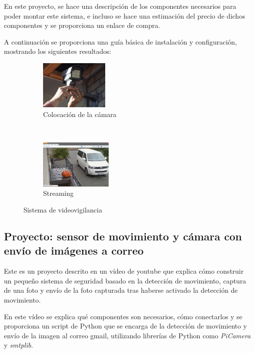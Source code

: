 En este proyecto, se hace una descripción de los componentes necesarios para poder montar este sistema, e incluso se hace una estimación del precio de dichos componentes y se proporciona un enlace de compra.

A continuación se proporciona una guía básica de instalación y configuración, mostrando los siguientes resultados:

\newpage

\begin{figure}[H]
	\centering
	\begin{subfigure}[b]{0.3\textwidth}
		\includegraphics[width=\textwidth,height=90px]{images/2}
		\caption{Colocación de la cámara}
	\end{subfigure}
	~ 
	\begin{subfigure}[b]{0.3\textwidth}
		\includegraphics[width=\textwidth,height=90px]{images/3}
		\caption{Streaming}
	\end{subfigure}
	\caption{Sistema de videovigilancia}

\end{figure}

\subsection{Proyecto: sensor de movimiento y cámara con envío de imágenes a correo} \label{sec:pj3}

Este es un proyecto descrito en un vídeo de youtube \cite{ref6} que explica cómo construir un pequeño sistema de seguridad basado en la detección de movimiento, captura de una foto y envío de la foto capturada tras haberse activado la detección de movimiento.

En este vídeo se explica qué componentes son necesarios, cómo conectarlos y se proporciona un script de Python que se encarga de la detección de movimiento y envío de la imagen al correo gmail, utilizando librerías de Python como \textit{PiCamera} y \textit{smtplib}.

